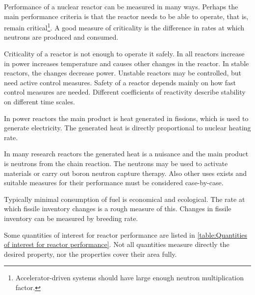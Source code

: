 Performance of a nuclear reactor can be measured in many ways. Perhaps the main performance criteria is that the reactor needs to be able to operate, that is, remain critical\footnote{Accelerator-driven systems should have large enough neutron multiplication factor.}. A good measure of criticality is the difference in rates at which neutrons are produced and consumed.

Criticality of a reactor is not enough to operate it safely. In all reactors increase in power increases temperature and causes other changes in the reactor. In stable reactors, the changes decrease power. Unstable reactors may be controlled, but need active control measures. Safety of a reactor depends mainly on how fast control measures are needed. Different coefficients of reactivity describe stability on different time scales.

In power reactors the main product is heat generated in fissions, which is used to generate electricity. The generated heat is directly proportional to nuclear heating rate. 

In many research reactors the generated heat is a nuisance and the main product is neutrons from the chain reaction. The neutrons may be used to activate materials or carry out boron neutron capture therapy. Also other uses exists and suitable measures for their performance must be considered case-by-case.

Typically minimal consumption of fuel is economical and ecological. The rate at which fissile inventory changes is a rough measure of this. Changes in fissile inventory can be measured by breeding rate.

Some quantities of interest for reactor performance are listed in \autoref{table:Quantities of interest for reactor performance}. Not all quantities measure directly the desired property, nor the properties cover their area fully.


